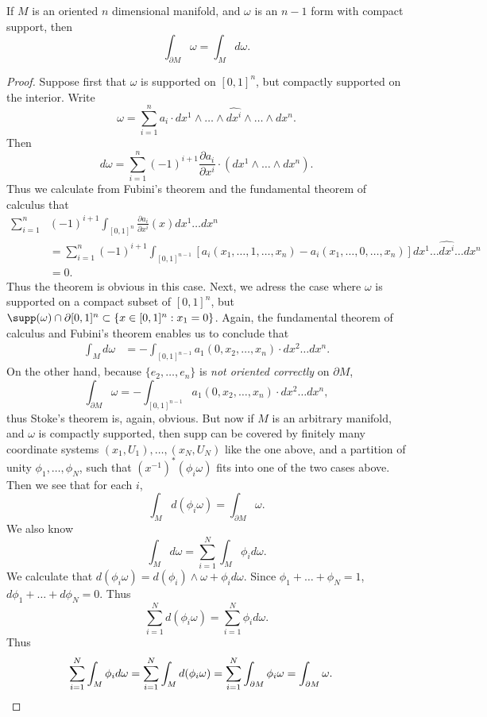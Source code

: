 \begin{theorem}
    If $M$ is an oriented $n$ dimensional manifold, and $\omega$ is an $n-1$ form with compact support, then
    \[ \int_{\partial M} \omega = \int_M d\omega. \]
\end{theorem}
\begin{proof}
    Suppose first that $\omega$ is supported on $[0,1]^n$, but compactly supported on the interior. Write
    \[ \omega = \sum_{i = 1}^n a_i \cdot dx^1 \wedge \dots \wedge \widehat{dx^i} \wedge \dots \wedge dx^n. \]
    Then
    \[ d\omega = \sum_{i = 1}^n (-1)^{i+1} \frac{\partial a_i}{\partial x^i} \cdot (dx^1 \wedge \dots \wedge dx^n). \]
    Thus we calculate from Fubini's theorem and the fundamental theorem of calculus that
    \begin{align*}
        \sum_{i = 1}^n& (-1)^{i+1} \int_{[0,1]^n} \frac{\partial a_i}{\partial x^i}(x) dx^1 \dots dx^n\\
        &= \sum_{i = 1}^n (-1)^{i+1} \int_{[0,1]^{n-1}} [a_i(x_1, \dots,1, \dots, x_n) - a_i(x_1, \dots, 0, \dots, x_n)] dx^1 \dots \widehat{dx^i} \dots dx^n\\
        &= 0.
    \end{align*}
    Thus the theorem is obvious in this case. Next, we adress the case where $\omega$ is supported on a compact subset of $[0,1]^n$, but $\supp(\omega) \cap \partial [0,1]^n \subset \{ x \in [0,1]^n : x_1 = 0 \}$. Again, the fundamental theorem of calculus and Fubini's theorem enables us to conclude that
    \begin{align*}
        \int_M d\omega &= - \int_{[0,1]^{n-1}} a_1(0, x_2, \dots, x_n) \cdot dx^2 \dots dx^n.
    \end{align*}
    On the other hand, because $\{ e_2, \dots, e_n \}$ is \emph{not oriented correctly} on $\partial M$,
    \[ \int_{\partial M} \omega = - \int_{[0,1]^{n-1}} a_1(0, x_2, \dots, x_n) \cdot dx^2 \dots dx^n, \]
    thus Stoke's theorem is, again, obvious. But now if $M$ is an arbitrary manifold, and $\omega$ is compactly supported, then $\text{supp}$ can be covered by finitely many coordinate systems $(x_1,U_1), \dots, (x_N, U_N)$ like the one above, and a partition of unity $\phi_1, \dots, \phi_N$, such that $(x^{-1})^*(\phi_i \omega)$ fits into one of the two cases above. Then we see that for each $i$,
    \[ \int_M d(\phi_i \omega) = \int_{\partial M} \omega. \]
    We also know
    \[ \int_M d\omega = \sum_{i = 1}^N \int_M \phi_i d\omega. \]
    We calculate that $d(\phi_i \omega) = d(\phi_i) \wedge \omega + \phi_i d\omega$. Since $\phi_1 + \dots + \phi_N = 1$, $d\phi_1 + \dots + d\phi_N = 0$. Thus
    \[ \sum_{i = 1}^N d(\phi_i \omega) = \sum_{i = 1}^N \phi_i d\omega. \]
    Thus
    \begin{align*}
        \sum_{i = 1}^N \int_M \phi_i d\omega &= \sum_{i = 1}^N \int_M d(\phi_i \omega) = \sum_{i = 1}^N \int_{\partial M} \phi_i \omega = \int_{\partial M} \omega. \qedhere
    \end{align*}
\end{proof}

